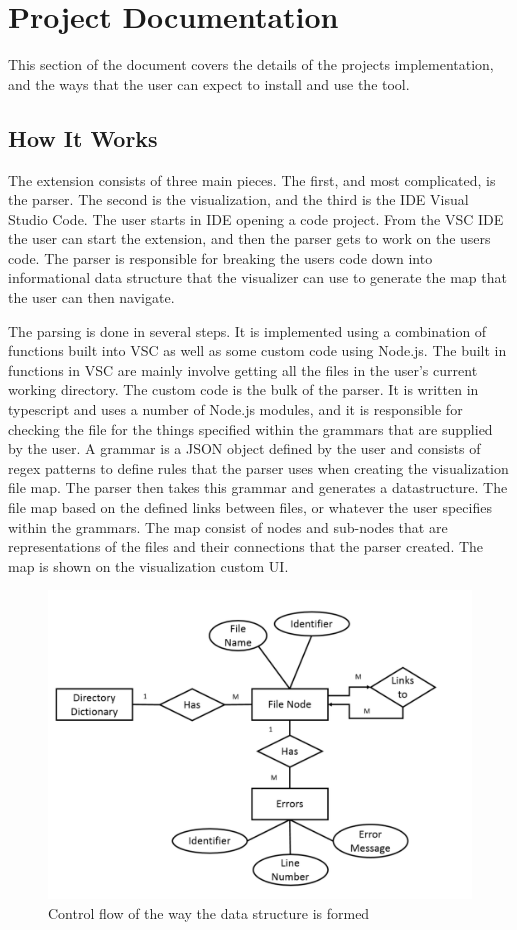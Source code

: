 \documentclass[letterpaper,10pt,titlepage,draftclsnofoot,onecolumn,onesided] {IEEEtran}
\begin{document}
\section{Project Documentation}
This section of the document covers the details of the projects implementation, and the ways that the user can expect to install and use the tool.

\subsection{How It Works}
The extension consists of three main pieces. The first, and most complicated, is the parser. 
The second is the visualization, and the third is the IDE Visual Studio Code.
The user starts in IDE opening a code project. 
From the VSC IDE the user can start the extension, and then the parser gets to work on the users code. 
The parser is responsible for breaking the users code down into informational data structure that the visualizer can use to generate the map that the user can then navigate. 

The parsing is done in several steps. 
It is implemented using a combination of functions built into VSC as well as some custom code using Node.js. 
The built in functions in VSC are mainly involve getting all the files in the user's current working directory. 
The custom code is the bulk of the parser.
It is written in typescript and uses a number of Node.js modules, and it is responsible for checking the file for the things specified within the grammars that are supplied by the user. 
A grammar is a JSON object defined by the user and consists of regex patterns to define  rules that the parser uses when creating the visualization file map. 
The parser then takes this grammar and generates a datastructure. 
The file map based on the defined links between files, or whatever the user specifies within the grammars.
The map consist of nodes and sub-nodes that are representations of the files and their connections that the parser created.
The map is shown on the visualization custom UI. \\

\begin{figure}[H]
	\centering
	\includegraphics[width=.75\textwidth]{InformationERDEPS-eps-converted-to}
	\caption{Control flow of the way the data structure is formed}
\end{figure}
\end{document}
